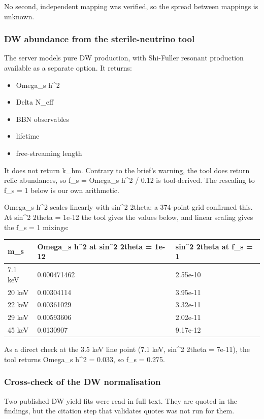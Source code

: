 \documentclass[11pt,a4paper]{article}
\begin{document}
No second, independent mapping was verified, so the spread between mappings is unknown.

\subsubsection{DW abundance from the sterile-neutrino tool}
The server models pure DW production, with Shi-Fuller resonant production available as a separate option. It returns:

\begin{itemize}
  \item Omega\_s h\textasciicircum{}2
  \item Delta N\_eff
  \item BBN observables
  \item lifetime
  \item free-streaming length
\end{itemize}
It does not return k\_hm. Contrary to the brief's warning, the tool does return relic abundances, so f\_s = Omega\_s h\textasciicircum{}2 / 0.12 is tool-derived. The rescaling to f\_s = 1 below is our own arithmetic.

Omega\_s h\textasciicircum{}2 scales linearly with sin\textasciicircum{}2 2theta; a 374-point grid confirmed this. At sin\textasciicircum{}2 2theta = 1e-12 the tool gives the values below, and linear scaling gives the f\_s = 1 mixings:

\begin{longtable}{@{}p{}p{}p{}@{}}
\toprule
\textbf{m\_s} & \textbf{Omega\_s h\textasciicircum{}2 at sin\textasciicircum{}2 2theta = 1e-12} & \textbf{sin\textasciicircum{}2 2theta at f\_s = 1} \\ \midrule \endhead
7.1 keV & 0.000471462 & 2.55e-10 \\
20 keV & 0.00304114 & 3.95e-11 \\
22 keV & 0.00361029 & 3.32e-11 \\
29 keV & 0.00593606 & 2.02e-11 \\
45 keV & 0.0130907 & 9.17e-12 \\
\bottomrule\end{longtable}
As a direct check at the 3.5 keV line point (7.1 keV, sin\textasciicircum{}2 2theta = 7e-11), the tool returns Omega\_s h\textasciicircum{}2 = 0.033, so f\_s = 0.275.

\subsubsection{Cross-check of the DW normalisation}
Two published DW yield fits were read in full text. They are quoted in the findings, but the citation step that validates quotes was not run for them.
\end{document}
